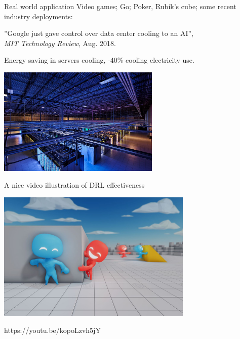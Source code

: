\documentclass{beamer}
\begin{document}
\begin{frame}{Real world application}
    Video games; Go; Poker, Rubik's cube; some recent industry deployments:
    
    \begin{center}
        ''Google just gave control over data center cooling to an AI'', \\ \textit{MIT Technology Review}, Aug. 2018.
    \end{center}

    Energy saving in servers cooling, -40\% cooling electricity use.

    \begin{center}
    \includegraphics[width=0.58\textwidth]{Figures/servers}
    \end{center}
\end{frame}


\begin{frame}{A nice video illustration of DRL effectiveness}
    
    \begin{center}
    \includegraphics[width=0.70\textwidth]{Figures/hideandseek}
    \end{center}

    \begin{center}
      https://youtu.be/kopoLzvh5jY
    \end{center}
\end{frame}
\end{document}
